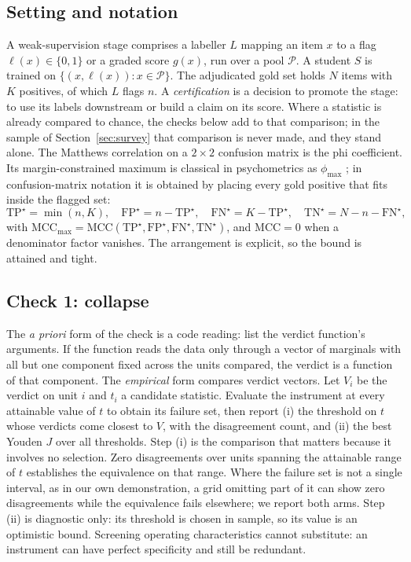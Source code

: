 \documentclass[review]{elsarticle}
\begin{document}
\subsection{Setting and notation}

A weak-supervision stage comprises a labeller $L$ mapping an item $x$ to a flag
$\ell(x) \in \{0,1\}$ or a graded score $g(x)$, run over a pool $\mathcal{P}$.
A student $S$ is trained on $\{(x,\ell(x)) : x \in \mathcal{P}\}$. The
adjudicated gold set holds $N$ items with $K$ positives, of which $L$ flags $n$. A \emph{certification} is a decision to promote the stage: to use its labels
downstream or build a claim on its score. Where a statistic is
already compared to chance, the checks below add to that comparison; in the
sample of Section~\ref{sec:survey} that comparison is never made, and they
stand alone. The Matthews
correlation on a $2\times2$ confusion matrix is the phi coefficient. Its
margin-constrained maximum is classical in psychometrics as $\phi_{\max}$
\cite{cureton1959phimax,guilford1965phi}; in confusion-matrix notation it is
obtained by placing every gold positive that fits inside the flagged set:
\begin{equation}
\mathrm{TP}^{\star} = \min(n,K), \quad
\mathrm{FP}^{\star} = n - \mathrm{TP}^{\star}, \quad
\mathrm{FN}^{\star} = K - \mathrm{TP}^{\star}, \quad
\mathrm{TN}^{\star} = N - n - \mathrm{FN}^{\star},
\label{eq:ceiling}
\end{equation}
with $\mathrm{MCC}_{\max} = \mathrm{MCC}(\mathrm{TP}^{\star}, \mathrm{FP}^{\star},
\mathrm{FN}^{\star}, \mathrm{TN}^{\star})$, and $\mathrm{MCC}=0$ when a
denominator factor vanishes. The arrangement is explicit, so the bound is
attained and tight.

\subsection{Check 1: collapse}
\label{sec:check-collapse}

The \emph{a priori} form of the check is a code reading: list the verdict
function's arguments. If the function reads the data only through a vector of
marginals with all but one component fixed across the units compared, the
verdict is a function of that component. The \emph{empirical} form compares verdict vectors. Let $V_i$ be the verdict on
unit $i$ and $t_i$ a candidate statistic.
Evaluate the instrument at every attainable value of $t$ to obtain its failure
set, then report (i) the threshold on $t$ whose verdicts come closest to $V$,
with the disagreement count, and (ii) the best Youden $J$ over all thresholds. Step (i) is the comparison that matters because it involves no selection. Zero disagreements over units spanning the attainable range of $t$ establishes
the equivalence on that range. Where the failure set is not a single interval,
as in our own demonstration, a grid omitting part of it can show zero
disagreements while the equivalence fails elsewhere; we report both arms. Step (ii) is diagnostic only: its threshold is chosen in sample, so its value
is an optimistic bound. Screening operating characteristics cannot substitute: an instrument can have
perfect specificity and still be redundant.
\end{document}
